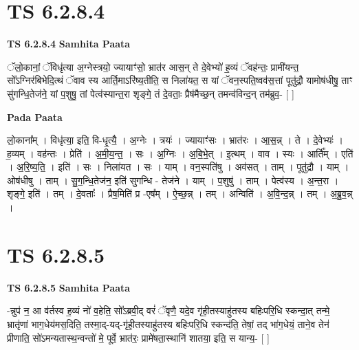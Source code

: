 \documentclass[17pt]{extarticle}
\begin{document}

\section{ TS 6.2.8.4 }

\textbf{TS 6.2.8.4 } \newline
\textbf{Samhita Paata} \newline

ॅलो॒कानां॒ ॅविधृ॑त्या अ॒ग्नेस्त्रयो॒ ज्यायाꣳ॑सो॒ भ्रात॑र आस॒न् ते दे॒वेभ्यो॑ ह॒व्यं ॅवह॑न्तः॒ प्रामी॑यन्त॒ सो᳚ऽग्निर॑बिभेदि॒त्थं ॅवाव स्य आर्ति॒माऽरि॑ष्य॒तीति॒ स निला॑यत॒ स यां ॅवन॒स्पति॒ष्वव॑स॒त्तां पूतु॑द्रौ॒ यामोष॑धीषु॒ ताꣳ सु॑गन्धि॒तेज॑ने॒ यां प॒शुषु॒ तां पेत्व॑स्यान्त॒रा शृङ्गे॒ तं दे॒वताः॒ प्रैष॑मैच्छ॒न् तमन्व॑विन्द॒न् तम॑ब्रुव॒- [  ] \newline

\textbf{Pada Paata} \newline

लो॒काना᳚म् । विधृ॑त्या॒ इति॒ वि-धृ॒त्यै॒ । अ॒ग्नेः । त्रयः॑ । ज्यायाꣳ॑सः । भ्रात॑रः । आ॒स॒न्न् । ते । दे॒वेभ्यः॑ । ह॒व्यम् । वह॑न्तः । प्रेति॑ । अ॒मी॒य॒न्त॒ । सः । अ॒ग्निः । अ॒बि॒भे॒त् । इ॒त्थम् । वाव । स्यः । आर्ति᳚म् । एति॑ । अ॒रि॒ष्य॒ति॒ । इति॑ । सः । निला॑यत । सः । याम् । वन॒स्पति॑षु । अव॑सत् । ताम् । पूतु॑द्रौ । याम् । ओष॑धीषु । ताम् । सु॒ग॒न्धि॒तेज॑न॒ इति॑ सुगन्धि - तेज॑ने । याम् । प॒शुषु॑ । ताम् । पेत्व॑स्य । अ॒न्त॒रा । शृङ्गे॒ इति॑ । तम् । दे॒वताः᳚ । प्रैष॒मिति॑ प्र -एष᳚म् । ऐ॒च्छ॒न्न् । तम् । अन्विति॑ । अ॒वि॒न्द॒न्न् । तम् । अ॒ब्रु॒व॒न्न् ।  \newline





\section{ TS 6.2.8.5 }

\textbf{TS 6.2.8.5 } \newline
\textbf{Samhita Paata} \newline

-न्नुप॑ न॒ आ व॑र्तस्व ह॒व्यं नो॑ व॒हेति॒ सो᳚ऽब्रवी॒द् वरं॑ ॅवृणै॒ यदे॒व गृ॑ही॒तस्याहु॑तस्य बहिःपरि॒धि स्कन्दा॒त् तन्मे॒ भ्रातृ॑णां भाग॒धेय॑मस॒दिति॒ तस्मा॒द्-यद्-गृ॑ही॒तस्याहु॑तस्य बहिःपरि॒धि स्कन्द॑ति॒ तेषां॒ तद् भा॑ग॒धेयं॒ ताने॒व तेन॑ प्रीणाति॒ सो॑ऽमन्यतास्थ॒न्वन्तो॑ मे॒ पूर्वे॒ भ्रात॑रः॒ प्रामे॑षता॒स्थानि॑ शातया॒ इति॒ स यान्य॒- [  ] \newline
\end{document}
